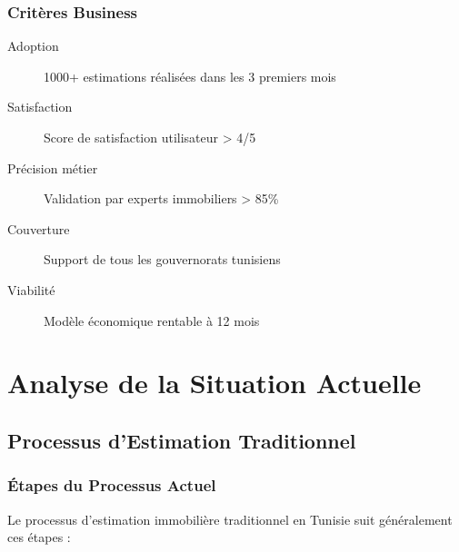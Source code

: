 \subsubsection{Critères Business}

\begin{description}
    \item[Adoption] 1000+ estimations réalisées dans les 3 premiers mois
    \item[Satisfaction] Score de satisfaction utilisateur > 4/5
    \item[Précision métier] Validation par experts immobiliers > 85\%
    \item[Couverture] Support de tous les gouvernorats tunisiens
    \item[Viabilité] Modèle économique rentable à 12 mois
\end{description}

\section{Analyse de la Situation Actuelle}
\label{sec:situation_actuelle}

\subsection{Processus d'Estimation Traditionnel}
\label{subsec:processus_traditionnel}

\subsubsection{Étapes du Processus Actuel}

Le processus d'estimation immobilière traditionnel en Tunisie suit généralement ces étapes :

